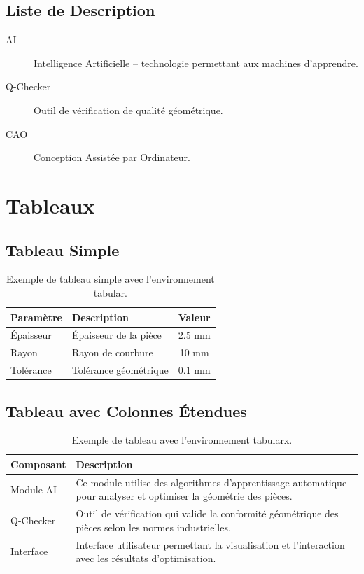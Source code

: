 \subsection{Liste de Description}
\begin{description}
    \item[AI] Intelligence Artificielle -- technologie permettant aux machines d'apprendre.
    \item[Q-Checker] Outil de vérification de qualité géométrique.
    \item[CAO] Conception Assistée par Ordinateur.
\end{description}

\section{Tableaux}

\subsection{Tableau Simple}
\begin{table}[!htpb]
    \caption{Exemple de tableau simple avec l'environnement tabular.}
    \label{tab:exemple-simple}
    \centering
    \begin{tabular}{llc}
        \toprule
        \textbf{Paramètre} & \textbf{Description} & \textbf{Valeur} \\ 
        \midrule
        Épaisseur          & Épaisseur de la pièce    & 2.5 mm  \\
        Rayon              & Rayon de courbure        & 10 mm   \\
        Tolérance          & Tolérance géométrique    & 0.1 mm  \\
        \bottomrule
    \end{tabular}
\end{table}

\subsection{Tableau avec Colonnes Étendues}
\begin{table}[!htpb]
    \caption{Exemple de tableau avec l'environnement tabularx.}
    \label{tab:exemple-tabularx}
    \begin{tabularx}{\textwidth}{lX}
        \toprule
        \textbf{Composant} & \textbf{Description} \\ 
        \midrule
        Module AI & Ce module utilise des algorithmes d'apprentissage automatique pour analyser et optimiser la géométrie des pièces. \\
        Q-Checker & Outil de vérification qui valide la conformité géométrique des pièces selon les normes industrielles. \\
        Interface & Interface utilisateur permettant la visualisation et l'interaction avec les résultats d'optimisation. \\
        \bottomrule
    \end{tabularx}
\end{table}

